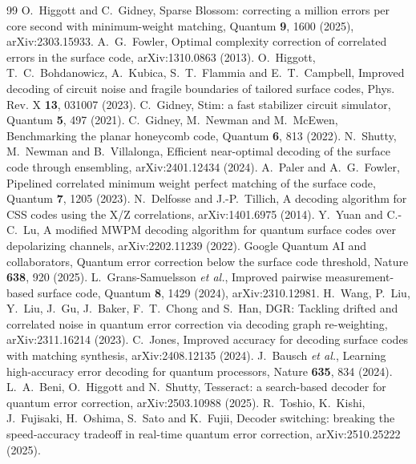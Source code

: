 \documentclass[aps,pra,twocolumn,superscriptaddress,nofootinbib]{revtex4-2}
\begin{document}
\begin{thebibliography}{99}
 O.~Higgott and C.~Gidney, Sparse Blossom: correcting a million errors per core second with minimum-weight matching, Quantum \textbf{9}, 1600 (2025), arXiv:2303.15933.
 A.~G.~Fowler, Optimal complexity correction of correlated errors in the surface code, arXiv:1310.0863 (2013).
 O.~Higgott, T.~C.~Bohdanowicz, A.~Kubica, S.~T.~Flammia and E.~T.~Campbell, Improved decoding of circuit noise and fragile boundaries of tailored surface codes, Phys. Rev. X \textbf{13}, 031007 (2023).
 C.~Gidney, Stim: a fast stabilizer circuit simulator, Quantum \textbf{5}, 497 (2021).
 C.~Gidney, M.~Newman and M.~McEwen, Benchmarking the planar honeycomb code, Quantum \textbf{6}, 813 (2022).
 N.~Shutty, M.~Newman and B.~Villalonga, Efficient near-optimal decoding of the surface code through ensembling, arXiv:2401.12434 (2024).
 A.~Paler and A.~G.~Fowler, Pipelined correlated minimum weight perfect matching of the surface code, Quantum \textbf{7}, 1205 (2023).
 N.~Delfosse and J.-P.~Tillich, A decoding algorithm for CSS codes using the X/Z correlations, arXiv:1401.6975 (2014).
 Y.~Yuan and C.-C.~Lu, A modified MWPM decoding algorithm for quantum surface codes over depolarizing channels, arXiv:2202.11239 (2022).
 Google Quantum AI and collaborators, Quantum error correction below the surface code threshold, Nature \textbf{638}, 920 (2025).
 L.~Grans-Samuelsson \emph{et al.}, Improved pairwise measurement-based surface code, Quantum \textbf{8}, 1429 (2024), arXiv:2310.12981.
 H.~Wang, P.~Liu, Y.~Liu, J.~Gu, J.~Baker, F.~T.~Chong and S.~Han, DGR: Tackling drifted and correlated noise in quantum error correction via decoding graph re-weighting, arXiv:2311.16214 (2023).
 C.~Jones, Improved accuracy for decoding surface codes with matching synthesis, arXiv:2408.12135 (2024).
 J.~Bausch \emph{et al.}, Learning high-accuracy error decoding for quantum processors, Nature \textbf{635}, 834 (2024).
 L.~A.~Beni, O.~Higgott and N.~Shutty, Tesseract: a search-based decoder for quantum error correction, arXiv:2503.10988 (2025).
 R.~Toshio, K.~Kishi, J.~Fujisaki, H.~Oshima, S.~Sato and K.~Fujii, Decoder switching: breaking the speed-accuracy tradeoff in real-time quantum error correction, arXiv:2510.25222 (2025).
\end{thebibliography}
\end{document}
